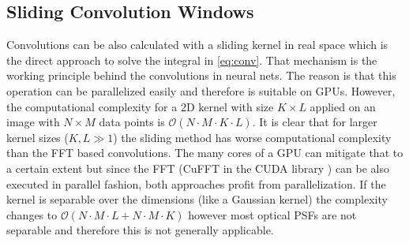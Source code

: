 \documentclass{juliacon}
\begin{document}
\subsection{Sliding Convolution Windows}
Convolutions can be also calculated with a sliding kernel in real space which is the direct approach to
solve the integral in \autoref{eq:conv}.
That mechanism is the working principle
behind the convolutions in neural nets. The reason is that this operation can be parallelized easily and therefore 
is suitable on GPUs. However, the computational complexity for a 2D kernel with size $K \times L$ applied on an image with
$N \times M$ data points is $\mathcal O(N \cdot M \cdot K \cdot L)$. It is clear that for larger kernel sizes ($K,L \gg 1$) the sliding method 
has worse computational complexity than the FFT based convolutions. The many cores of a GPU can mitigate that to a certain extent
but since the FFT (CuFFT in the CUDA library \cite{CUDA}) can be also executed in parallel fashion, both approaches profit from parallelization.
If the kernel is separable over the dimensions (like a Gaussian kernel) the complexity changes to $\mathcal O(N \cdot M \cdot L +  N \cdot M \cdot K)$ however most optical PSFs are not separable and therefore this is not generally applicable. 
\end{document}
